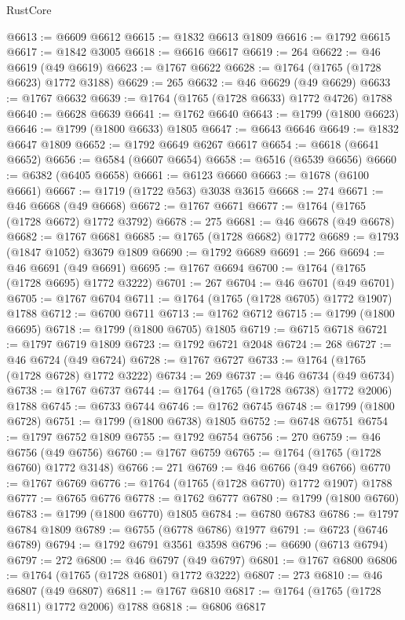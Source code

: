 \begin{lexlean}{RustCore}
\begin{coremodule}
@6613 := @6609 @6612
@6615 := @1832 @6613 @1809
@6616 := @1792 @6615
@6617 := @1842 @3005
@6618 := @6616 @6617
@6619 := 264
@6622 := @46 @6619 (@49 @6619)
@6623 := @1767 @6622
@6628 := @1764 (@1765 (@1728 @6623) @1772 @3188)
@6629 := 265
@6632 := @46 @6629 (@49 @6629)
@6633 := @1767 @6632
@6639 := @1764 (@1765 (@1728 @6633) @1772 @4726) @1788
@6640 := @6628 @6639
@6641 := @1762 @6640
@6643 := @1799 (@1800 @6623)
@6646 := @1799 (@1800 @6633) @1805
@6647 := @6643 @6646
@6649 := @1832 @6647 @1809
@6652 := @1792 @6649 @6267 @6617
@6654 := @6618 (@6641 @6652)
@6656 := @6584 (@6607 @6654)
@6658 := @6516 (@6539 @6656)
@6660 := @6382 (@6405 @6658)
@6661 := @6123 @6660
@6663 := @1678 (@6100 @6661)
@6667 := @1719 (@1722 @563) @3038 @3615
@6668 := 274
@6671 := @46 @6668 (@49 @6668)
@6672 := @1767 @6671
@6677 := @1764 (@1765 (@1728 @6672) @1772 @3792)
@6678 := 275
@6681 := @46 @6678 (@49 @6678)
@6682 := @1767 @6681
@6685 := @1765 (@1728 @6682) @1772
@6689 := @1793 (@1847 @1052) @3679 @1809
@6690 := @1792 @6689
@6691 := 266
@6694 := @46 @6691 (@49 @6691)
@6695 := @1767 @6694
@6700 := @1764 (@1765 (@1728 @6695) @1772 @3222)
@6701 := 267
@6704 := @46 @6701 (@49 @6701)
@6705 := @1767 @6704
@6711 := @1764 (@1765 (@1728 @6705) @1772 @1907) @1788
@6712 := @6700 @6711
@6713 := @1762 @6712
@6715 := @1799 (@1800 @6695)
@6718 := @1799 (@1800 @6705) @1805
@6719 := @6715 @6718
@6721 := @1797 @6719 @1809
@6723 := @1792 @6721 @2048
@6724 := 268
@6727 := @46 @6724 (@49 @6724)
@6728 := @1767 @6727
@6733 := @1764 (@1765 (@1728 @6728) @1772 @3222)
@6734 := 269
@6737 := @46 @6734 (@49 @6734)
@6738 := @1767 @6737
@6744 := @1764 (@1765 (@1728 @6738) @1772 @2006) @1788
@6745 := @6733 @6744
@6746 := @1762 @6745
@6748 := @1799 (@1800 @6728)
@6751 := @1799 (@1800 @6738) @1805
@6752 := @6748 @6751
@6754 := @1797 @6752 @1809
@6755 := @1792 @6754
@6756 := 270
@6759 := @46 @6756 (@49 @6756)
@6760 := @1767 @6759
@6765 := @1764 (@1765 (@1728 @6760) @1772 @3148)
@6766 := 271
@6769 := @46 @6766 (@49 @6766)
@6770 := @1767 @6769
@6776 := @1764 (@1765 (@1728 @6770) @1772 @1907) @1788
@6777 := @6765 @6776
@6778 := @1762 @6777
@6780 := @1799 (@1800 @6760)
@6783 := @1799 (@1800 @6770) @1805
@6784 := @6780 @6783
@6786 := @1797 @6784 @1809
@6789 := @6755 (@6778 @6786) @1977
@6791 := @6723 (@6746 @6789)
@6794 := @1792 @6791 @3561 @3598
@6796 := @6690 (@6713 @6794)
@6797 := 272
@6800 := @46 @6797 (@49 @6797)
@6801 := @1767 @6800
@6806 := @1764 (@1765 (@1728 @6801) @1772 @3222)
@6807 := 273
@6810 := @46 @6807 (@49 @6807)
@6811 := @1767 @6810
@6817 := @1764 (@1765 (@1728 @6811) @1772 @2006) @1788
@6818 := @6806 @6817

\end{coremodule}
\end{lexlean}

